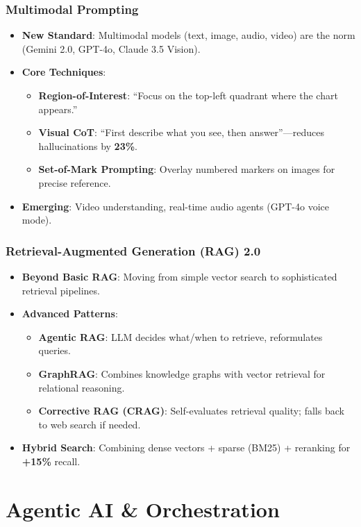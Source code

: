 \documentclass{beamer}
\begin{document}
\begin{frame}
    \frametitle{Multimodal Prompting}
    \begin{itemize}
        \item \textbf{New Standard}: Multimodal models (text, image, audio, video) are the norm (Gemini 2.0, GPT-4o, Claude 3.5 Vision).
        \item \textbf{Core Techniques}:
        \begin{itemize}
            \item \textbf{Region-of-Interest}: ``Focus on the top-left quadrant where the chart appears.''
            \item \textbf{Visual CoT}: ``First describe what you see, then answer''---reduces hallucinations by \textbf{23\%}.
            \item \textbf{Set-of-Mark Prompting}: Overlay numbered markers on images for precise reference.
        \end{itemize}
        \item \textbf{Emerging}: Video understanding, real-time audio agents (GPT-4o voice mode).
    \end{itemize}
\end{frame}

\begin{frame}
    \frametitle{Retrieval-Augmented Generation (RAG) 2.0}
    \begin{itemize}
        \item \textbf{Beyond Basic RAG}: Moving from simple vector search to sophisticated retrieval pipelines.
        \item \textbf{Advanced Patterns}:
        \begin{itemize}
            \item \textbf{Agentic RAG}: LLM decides what/when to retrieve, reformulates queries.
            \item \textbf{GraphRAG}: Combines knowledge graphs with vector retrieval for relational reasoning.
            \item \textbf{Corrective RAG (CRAG)}: Self-evaluates retrieval quality; falls back to web search if needed.
        \end{itemize}
        \item \textbf{Hybrid Search}: Combining dense vectors + sparse (BM25) + reranking for \textbf{+15\%} recall.
    \end{itemize}
\end{frame}

\section{Agentic AI \& Orchestration}
\end{document}
